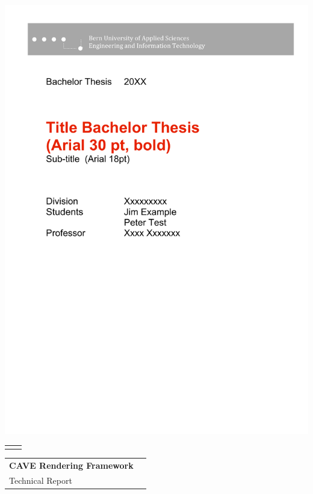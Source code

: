 \begin{titlepage}
 
\begin{flushleft}

\vspace*{-2.0in}\includegraphics[scale=1.1]{../tex-include/figures/title_header}

\vspace*{2in}

\begin{tabular}{p{5cm}p{8cm}}
\Large{} & \Large{} \\ 
\end{tabular}

\vspace{1.8cm}
\begin{tabular}{ll}
\Huge{\bfseries CAVE Rendering Framework}\\[0.3cm]
\huge{Technical Report}\\[1.8cm]
\end{tabular}


\end{flushleft}
\end{titlepage}
